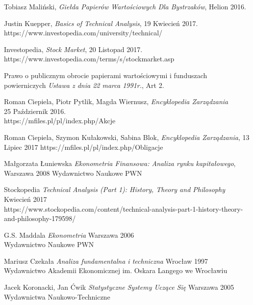 \documentclass[man,mfi|min|mpt|mok|mub|mza|miz|bsp]{mgrwms}
\begin{document}
\begin{thebibliography}{88}  %

 Tobiasz Maliński, 
\textit{Giełda Papierów Wartościowych Dla Bystrzaków}, Helion 2016.

 Justin Kuepper,
\textit{Basics of Technical Analysis}, 19 Kwiecień 2017.
https://www.investopedia.com/university/technical/

 Investopedia,
\textit{Stock Market}, 20 Listopad 2017.\\
https://www.investopedia.com/terms/s/stockmarket.asp

 Prawo o publicznym obrocie papierami wartościowymi i funduszach powierniczych
\textit{Ustawa z dnia 22 marca 1991r.}, Art 2.

 Roman Ciepiela, Piotr Pytlik, Magda Wiernusz,
\textit{Encyklopedia Zarządzania}\\
25 Październik 2016.\\
https://mfiles.pl/pl/index.php/Akcje

 Roman Ciepiela, Szymon Kułakowski, Sabina Blok,
\textit{Encyklopedia Zarządzania}, 13 Lipiec 2017
https://mfiles.pl/pl/index.php/Obligacje

 Małgorzata Łuniewska
\textit{Ekonometria Finansowa: Analiza rynku kapitałowego}, Warszawa 2008
Wydawnictwo Naukowe PWN

 Stockopedia
\textit{Technical Analysis (Part 1): History, Theory and Philosophy}\\
Kwiecień 2017\\
https://www.stockopedia.com/content/technical-analysis-part-1-history-theory-and-philosophy-179598/

 G.S. Maddala
\textit{Ekonometria} Warszawa 2006\\
Wydawnictwo Naukowe PWN

 Mariusz Czekała
\textit{Analiza fundamentalna i techniczna} Wrocław 1997\\
Wydawnictwo Akademii Ekonomicznej im. Oskara Langego we Wrocławiu

 Jacek Koronacki, Jan Ćwik
\textit{Statystyczne Systemy Uczące Się} Warszawa 2005\\
Wydawnictwa Naukowo-Techniczne


\end{thebibliography}
\end{document}
